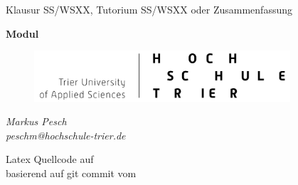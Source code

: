 \begin{titlepage}
  \begin{center}
    \begin{large}
      Klausur SS/WSXX, Tutorium SS/WSXX oder Zusammenfassung 
    \end{large}
    
    \begin{huge}
      \begin{singlespace}
            \textbf{Modul}
      \end{singlespace}
    \end{huge}

    \vspace{0.5cm}

    \begin{figure}[h]
      \centering
      \includegraphics[width=0.85\textwidth]{img//logo.png}
      \label{img:fh-trier-logo}
    \end{figure}

    \vspace{2cm}
    \begin{large}
      \textit{Markus Pesch} \\
      \textit{peschm@hochschule-trier.de}
    \end{large}
    \vspace{2cm}
    
    Latex Quellcode auf  \\
    basierend auf git commit  vom 
    
    
  \end{center}
\end{titlepage}
